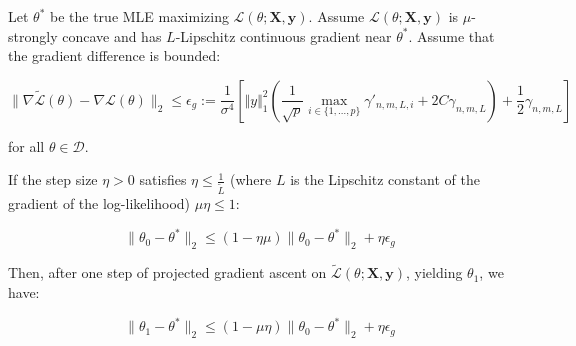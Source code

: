 \begin{proposition}\label{prop:mle-closeness-one-step}
Let $\theta^*$ be the true MLE maximizing $\mathcal{L}(\theta; \mathbf{X}, \mathbf{y})$. Assume $\mathcal{L}(\theta; \mathbf{X}, \mathbf{y})$ is $\mu$-strongly concave and has $L$-Lipschitz continuous gradient near $\theta^*$. Assume that the gradient difference is bounded:

$$
\| \nabla \tilde{\mathcal{L}}(\theta) - \nabla \mathcal{L}(\theta) \|_2 \leq \epsilon_g:= \frac{1}{\sigma^4}\left[\Vert y\Vert_1^2\left(\frac{1}{\sqrt{p}}\max_{i \in \{1,\ldots,p\}} \gamma'_{n,m,L,i}+2 C\gamma_{n,m,L}\right)+\frac{1}{2}\gamma_{n,m,L}\right]
$$

for all $\theta\in \mathcal{D}$.

If the step size $\eta>0$ satisfies $\eta \leq \frac{1}{\tilde{L}}$ (where $L$ is the Lipschitz constant of the gradient of the log-likelihood) $\mu\eta\leq 1$:

$$
\| \theta_0 - \theta^* \|_2 \leq (1 - \eta \mu) \| \theta_0 - \theta^* \|_2+\eta \epsilon_g
$$

Then, after one step of projected gradient ascent on $\tilde{\mathcal{L}}(\theta; \mathbf{X}, \mathbf{y})$, yielding $\theta_1$, we have:

$$
\| \theta_1 - \theta^* \|_2 \leq (1 - \mu \eta) \| \theta_0 - \theta^* \|_2 + \eta \epsilon_g
$$
\end{proposition}
